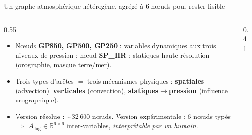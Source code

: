 \documentclass[aspectratio=169,10pt]{beamer}
\newcommand{\HR}{\mathrm{HR}}
\newcommand{\Adag}{A_{\mathrm{dag}}}
\begin{document}
\begin{frame}{Un graphe atmosphérique hétérogène, agrégé à 6 n\oe{}uds pour rester lisible}
  \begin{columns}[c]
    \begin{column}{0.55\textwidth}
      \small
      \begin{itemize}
        \item N\oe{}uds \textbf{GP850, GP500, GP250} : variables dynamiques aux trois
              niveaux de pression ; n\oe{}ud \textbf{SP\_HR} : statiques haute résolution
              (orographie, masque terre/mer).
        \item Trois types d'arêtes $=$ trois mécanismes physiques :
              \textbf{spatiales} (advection), \textbf{verticales} (convection),
              \textbf{statiques$\to$pression} (influence orographique).
        \item Version résolue : $\sim$32\,600 n\oe{}uds. Version expérimentale :
              \alert{6 n\oe{}uds typés} $\Rightarrow$ $\Adag \in \mathbb{R}^{6\times 6}$
              inter-variables, \emph{interprétable par un humain}.
      \end{itemize}
    \end{column}
    \begin{column}{0.41\textwidth}
      \centering
    \end{column}
  \end{columns}
\end{frame}
\end{document}
